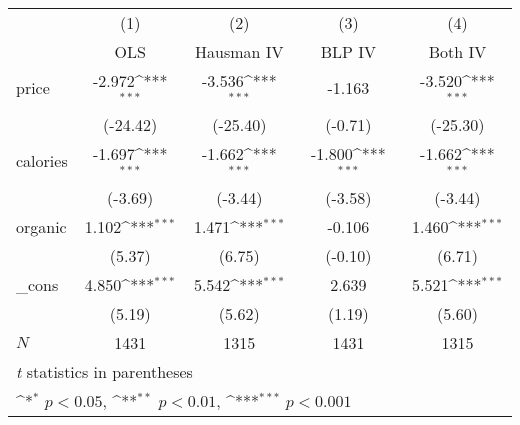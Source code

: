 {
\def\sym#1{\ifmmode^{#1}\else\(^{#1}\)\fi}
\begin{tabular}{l*{4}{c}}
\hline\hline
            &\multicolumn{1}{c}{(1)}&\multicolumn{1}{c}{(2)}&\multicolumn{1}{c}{(3)}&\multicolumn{1}{c}{(4)}\\
            &\multicolumn{1}{c}{OLS}&\multicolumn{1}{c}{Hausman IV}&\multicolumn{1}{c}{BLP IV}&\multicolumn{1}{c}{Both IV}\\
\hline
price       &      -2.972\sym{***}&      -3.536\sym{***}&      -1.163         &      -3.520\sym{***}\\
            &    (-24.42)         &    (-25.40)         &     (-0.71)         &    (-25.30)         \\
[1em]
calories    &      -1.697\sym{***}&      -1.662\sym{***}&      -1.800\sym{***}&      -1.662\sym{***}\\
            &     (-3.69)         &     (-3.44)         &     (-3.58)         &     (-3.44)         \\
[1em]
organic     &       1.102\sym{***}&       1.471\sym{***}&      -0.106         &       1.460\sym{***}\\
            &      (5.37)         &      (6.75)         &     (-0.10)         &      (6.71)         \\
[1em]
\_cons      &       4.850\sym{***}&       5.542\sym{***}&       2.639         &       5.521\sym{***}\\
            &      (5.19)         &      (5.62)         &      (1.19)         &      (5.60)         \\
\hline
\(N\)       &        1431         &        1315         &        1431         &        1315         \\
\hline\hline
\multicolumn{5}{l}{\footnotesize \textit{t} statistics in parentheses}\\
\multicolumn{5}{l}{\footnotesize \sym{*} \(p<0.05\), \sym{**} \(p<0.01\), \sym{***} \(p<0.001\)}\\
\end{tabular}
}
